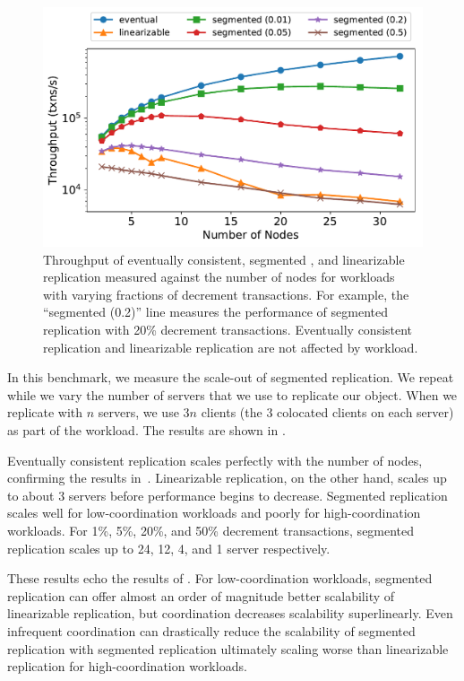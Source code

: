 \begin{figure}[t]
  \centering
  \includegraphics[width=\columnwidth]{figures/throughput_vs_num_nodes_multi.pdf}
  \caption{%
    Throughput of eventually consistent, segmented \invariantconfluent{}, and
    linearizable replication measured against the number of nodes for workloads
    with varying fractions of decrement transactions. For example, the
    ``segmented (0.2)'' line measures the performance of segmented
    \invariantconfluent{} replication with 20\% decrement transactions.
    Eventually consistent replication and linearizable replication are not
    affected by workload.
  }
\end{figure}

\begin{benchmark}
  In this benchmark, we measure the scale-out of segmented
  \invariantconfluent{} replication. We repeat  while
  we vary the number of servers that we use to replicate our object. When we
  replicate with $n$ servers, we use $3n$ clients (the $3$ colocated clients on
  each server) as part of the workload. The results are shown in
  .

  Eventually consistent replication scales perfectly with the number of nodes,
  confirming the results in~\cite{bailis2014coordination}. Linearizable
  replication, on the other hand, scales up to about 3 servers before
  performance begins to decrease. Segmented \invariantconfluent{} replication
  scales well for low-coordination workloads and poorly for high-coordination
  workloads. For 1\%, 5\%, 20\%, and 50\% decrement transactions, segmented
  \invariantconfluent{} replication scales up to 24, 12, 4, and 1 server
  respectively.

  These results echo the results of . For
  low-coordination workloads, segmented \invariantconfluent{} replication can
  offer almost an order of magnitude better scalability of linearizable
  replication, but coordination decreases scalability superlinearly. Even
  infrequent coordination can drastically reduce the scalability of segmented
  \invariantconfluent{} replication with segmented \invariantconfluent{}
  replication ultimately scaling worse than linearizable replication for
  high-coordination workloads.
\end{benchmark}
